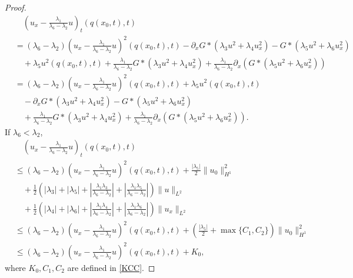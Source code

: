 \documentclass[11pt]{article}
\begin{document}
\begin{proof}
\begin{equation*}
\begin{aligned}
&\quad\left(u_x -\frac{\lambda_1}{\lambda_6-\lambda_2}u\right)_t(q(x_0,t),t) \\
&= (\lambda_6-\lambda_2) \left(u_x -\frac{\lambda_1}{\lambda_6-\lambda_2}u\right)^2 (q(x_0,t),t)
-\partial_xG\ast(\lambda_3 u^2 + \lambda_4 u_x^2) -   G \ast (\lambda_5 u^2 + \lambda_6 u_x^2)\\
&\quad+\lambda_5 u^2(q(x_0,t),t)+\frac{\lambda_1}{\lambda_6-\lambda_2}G\ast(\lambda_3 u^2 + \lambda_4 u_x^2) + \frac{\lambda_1}{\lambda_6-\lambda_2}\partial_x \left(  G \ast (\lambda_5 u^2 + \lambda_6 u_x^2) \right)\\
&= (\lambda_6-\lambda_2) \left(u_x -\frac{\lambda_1}{\lambda_6-\lambda_2}u\right)^2 (q(x_0,t),t)+\lambda_5 u^2(q(x_0,t),t)\\
&\quad
-\partial_xG\ast(\lambda_3 u^2 + \lambda_4 u_x^2) -   G \ast (\lambda_5 u^2 + \lambda_6 u_x^2)\\
&\quad+\frac{\lambda_1}{\lambda_6-\lambda_2}G\ast(\lambda_3 u^2 + \lambda_4 u_x^2) + \frac{\lambda_1}{\lambda_6-\lambda_2}\partial_x \left(  G \ast (\lambda_5 u^2 + \lambda_6 u_x^2) \right).
\end{aligned}
\end{equation*}
If $\lambda_6<\lambda_2$, 
\begin{equation*}
\begin{aligned}
&\quad\left(u_x -\frac{\lambda_1}{\lambda_6-\lambda_2}u\right)_t(q(x_0,t),t) \\
&\leq (\lambda_6-\lambda_2) \left(u_x -\frac{\lambda_1}{\lambda_6-\lambda_2}u\right)^2 (q(x_0,t),t)
+\frac{|\lambda_5|}{2}\|u_0\|_{H^1}^2\\
&\quad+\frac{1}{2}\left(|\lambda_3|+|\lambda_5|
+\left|\frac{\lambda_1\lambda_3}{\lambda_6-\lambda_2}\right|
+\left|\frac{\lambda_1\lambda_5}{\lambda_6-\lambda_2}\right|\right)\|u\|_{L^2}\\
&\quad+\frac{1}{2}\left(|\lambda_4|+|\lambda_6|
+\left|\frac{\lambda_1\lambda_4}{\lambda_6-\lambda_2}\right|
+\left|\frac{\lambda_1\lambda_6}{\lambda_6-\lambda_2}\right|\right)\|u_x\|_{L^2}\\
&\leq (\lambda_6-\lambda_2) \left(u_x -\frac{\lambda_1}{\lambda_6-\lambda_2}u\right)^2 (q(x_0,t),t)
+\left(\frac{|\lambda_5|}{2}+\max\{C_1,C_2\}\right)\|u_0\|_{H^1}^2\\
&\leq (\lambda_6-\lambda_2) \left(u_x -\frac{\lambda_1}{\lambda_6-\lambda_2}u\right)^2 (q(x_0,t),t)
+K_0,
\end{aligned}
\end{equation*}
where $K_0,C_1,C_2$ are defined in \eqref{KCC}.


\end{proof}
\end{document}
